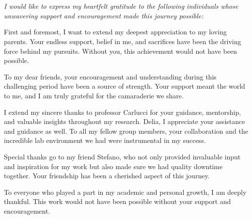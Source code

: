 \documentclass[a4,11pt,openright]{report}
\begin{document}
\chapter*{} %
\vspace*{\fill}
\begin{flushleft}
	\it
	I would like to express my heartfelt gratitude to the following individuals whose unwavering support and encouragement made this journey possible:

	First and foremost, I want to extend my deepest appreciation to my loving parents. Your endless support, belief in me, and sacrifices have been the driving force behind my pursuits. Without you, this achievement would not have been possible.

	To my dear friends, your encouragement and understanding during this challenging period have been a source of strength. Your support meant the world to me, and I am truly grateful for the camaraderie we share.

	I extend my sincere thanks to professor Carlucci for your guidance, mentorship, and valuable insights throughout my research. Delia, I appreciate your assistance and guidance as well. To all my fellow group members, your collaboration and the incredible lab environment we had were instrumental in my success.

	Special thanks go to my friend Stefano, who not only provided invaluable input and inspiration for my work but also made sure we had quality downtime together. Your friendship has been a cherished aspect of this journey.

	To everyone who played a part in my academic and personal growth, I am deeply thankful. This work would not have been possible without your support and encouragement.
	\vspace*{\fill}

\end{flushleft}
\vspace*{\fill}

\afterpage{\blankpage}

\end{document}
